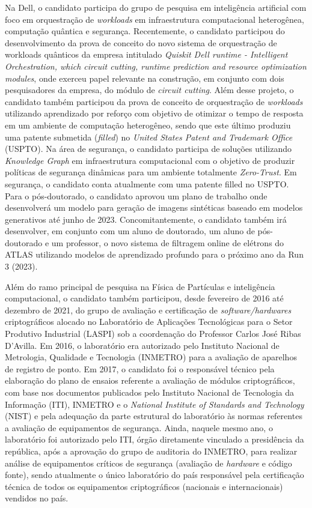 Na Dell, o candidato participa do grupo de pesquisa em inteligência artificial com foco em orquestração 
de \emph{workloads} em infraestrutura computacional heterogênea, computação quântica e segurança. 
Recentemente, o candidato participou do desenvolvimento da prova de conceito do novo sistema de 
orquestração de workloads quânticos da empresa intitulado \emph{Quiskit Dell runtime - Intelligent 
Orchestration, which circuit cutting, runtime prediction and resource optimization modules}, onde 
exerceu papel relevante na construção, em conjunto com dois pesquisadores da empresa, do módulo de 
\emph{circuit cutting}. Além desse projeto, o candidato também participou da prova de conceito de orquestração 
de \emph{workloads} utilizando aprendizado por reforço com objetivo de otimizar o tempo de resposta em um 
ambiente de computação heterogêneo, sendo que este último produziu uma patente submetida (\emph{filled}) no 
\emph{United States Patent and Trademark Office} (USPTO). Na área de segurança, o candidato participa de soluções 
utilizando \emph{Knowledge Graph} em infraestrutura computacional com o objetivo de produzir políticas de segurança 
dinâmicas para um ambiente totalmente \emph{Zero-Trust}. Em segurança, o candidato conta atualmente com uma patente 
filled no USPTO. Para o pós-doutorado, o candidato aprovou um plano de trabalho onde desenvolverá um modelo 
para geração de imagens sintéticas baseado em modelos generativos até junho de 2023. Concomitantemente, o 
candidato também irá desenvolver, em conjunto com um aluno de doutorado, um aluno de pós-doutorado e um 
professor, o novo sistema de filtragem online de elétrons do ATLAS utilizando modelos de aprendizado profundo 
para o próximo ano da Run 3 (2023). 




Além do ramo principal de pesquisa na Física de Partículas e inteligência computacional, o candidato 
também participou, desde fevereiro de 2016 até dezembro de 2021, do grupo de avaliação e certificação 
de \emph{software/hardwares} criptográficos alocado no Laboratório de Aplicações Tecnológicas para 
o Setor Produtivo Industrial (LASPI) sob a coordenação do Professor Carlos José Ribas D'Avilla. 
Em 2016, o laboratório era autorizado pelo Instituto Nacional de Metrologia, Qualidade e Tecnologia (INMETRO) 
para a avaliação de aparelhos de registro de ponto. 
Em 2017, o candidato foi o responsável técnico pela elaboração do plano de ensaios referente a avaliação 
de módulos criptográficos, com base nos documentos publicados pelo Instituto Nacional de Tecnologia 
da Informação (ITI), INMETRO e o \emph{National Institute of Standards and Technology} (NIST) e pela adequação 
da parte estrutural do laboratório às normas referentes a avaliação de equipamentos de segurança. 
Ainda, naquele mesmo ano, o laboratório foi autorizado pelo ITI, órgão diretamente vinculado a presidência 
da república, após a aprovação do grupo de auditoria do INMETRO, para realizar análise de equipamentos críticos 
de segurança (avaliação de \emph{hardware} e código fonte), sendo atualmente o único laboratório do país 
responsável pela certificação técnica de todos os equipamentos criptográficos (nacionais e internacionais) 
vendidos no país. 

